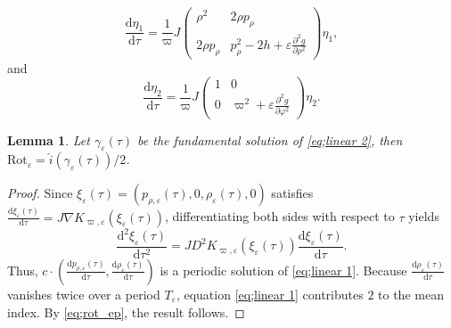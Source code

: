 \documentclass[11pt]{amsart}
\newcommand{\ep}{\varepsilon}
\newcommand{\om}{\varpi}
\newtheorem{lemma}{Lemma}[section]
\begin{document}
\begin{equation}\label{eq;linear 1}
	\frac{\mathrm{d}\eta_{1}}{\mathrm{d}\tau}=\frac{1}{\om}J\left({\begin{array}{cc}
			\rho^{2} & 2\rho p_{\rho}\\
			2\rho p_{\rho} & p_{\rho}^{2}-2h+\ep\frac{\partial^{2}g}{\partial \rho^{2}}
	\end{array}}\right)\eta_{1},
\end{equation}
and
\begin{equation}\label{eq;linear 2}
	\frac{\mathrm{d}\eta_{2}}{\mathrm{d}\tau}=\frac{1}{\om}J\left({\begin{array}{cc}
			1 & 0\\
			0 & \om^{2}+\ep\frac{\partial^{2}g}{\partial \varphi^{2}}
	\end{array}}\right)\eta_{2}.
\end{equation}  
\begin{lemma}\label{lemma;only deponds on 2}
		Let $\gamma_\ep(\tau)$ be the fundamental solution of \eqref{eq;linear 2}, then $\text{Rot}_\ep=\hat{i}(\gamma_\ep(\tau))/2$.
	\end{lemma}
\begin{proof}
	Since $\xi_{\ep}(\tau)=(p_{\rho,\ep}(\tau),0,\rho_\ep(\tau),0)$ satisfies  
	$\frac{\mathrm{d}\xi_{\ep}(\tau)}{\mathrm{d}\tau}=J\nabla K_{\om,\ep}(\xi_{\ep}(\tau))$,
	differentiating both sides with respect to $\tau$ yields  
	$$
	\frac{\mathrm{d}^2\xi_{\ep}(\tau)}{\mathrm{d}\tau^2} = J D^2 K_{\om,\ep}(\xi_{\ep}(\tau)) \frac{\mathrm{d}\xi_{\ep}(\tau)}{\mathrm{d}\tau}.
	$$  
	Thus, $c \cdot \left( \frac{\mathrm{d}p_{\rho,\ep}(\tau)}{\mathrm{d}\tau}, \frac{\mathrm{d}\rho_\ep(\tau)}{\mathrm{d}\tau} \right)$ is a periodic solution of \eqref{eq;linear 1}. Because $\frac{\mathrm{d}\rho_\ep(\tau)}{\mathrm{d}\tau}$ vanishes twice over a period $T_\ep$, equation \eqref{eq;linear 1} contributes $2$ to the mean index. By \eqref{eq;rot_ep}, the result follows.
\end{proof}
\end{document}
